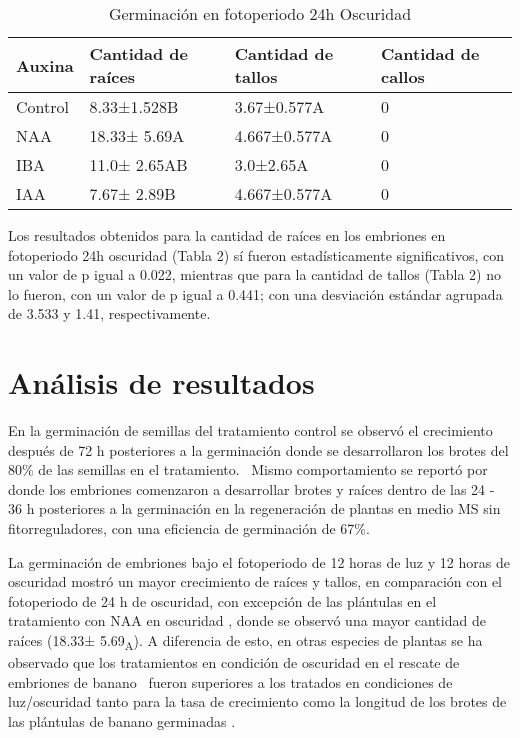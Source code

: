 \documentclass{article}
\begin{document}
\begin{multicols}{2}
\begin{table*}[ht]
\centering
\begin{tabularx}{\textwidth}{ | X | X | X | X | }
\toprule
\rowcolor[HTML]{EFEFEF} 
Auxina  & Cantidad de raíces & Cantidad de tallos & Cantidad de callos \\ \midrule
Control & 8.33±1.528B        & 3.67±0.577A        & 0                  \\ \midrule
NAA     & 18.33± 5.69A       & 4.667±0.577A       & 0                  \\ \midrule
IBA     & 11.0± 2.65AB       & 3.0±2.65A          & 0                  \\ \midrule
IAA     & 7.67± 2.89B        & 4.667±0.577A       & 0                  \\ \bottomrule
\end{tabularx}
\caption{Germinación en fotoperiodo 24h Oscuridad}
\end{table*}


Los resultados obtenidos para la cantidad de raíces en los embriones en fotoperiodo 24h oscuridad (Tabla 2) sí fueron estadísticamente significativos, con un valor de p igual a 0.022, mientras que para la cantidad de tallos (Tabla 2) no lo fueron, con un valor de p igual a 0.441; con una desviación estándar agrupada de 3.533 y 1.41, respectivamente. 

\section{Análisis de resultados}

En la germinación de semillas del tratamiento control se observó el crecimiento después de 72 h posteriores a la germinación donde se desarrollaron los brotes del 80\% de las semillas en el tratamiento.  Mismo comportamiento se reportó por \cite{12} donde los embriones comenzaron a desarrollar brotes y raíces dentro de las 24 - 36 h posteriores a la germinación en la regeneración de plantas en medio MS sin fitorreguladores, con una eficiencia de germinación de 67\%. 

La germinación de embriones bajo el fotoperiodo de 12 horas de luz y 12 horas de oscuridad mostró un mayor crecimiento de raíces y tallos, en comparación con el fotoperiodo de 24 h de oscuridad, con excepción de las plántulas en el tratamiento con NAA en oscuridad , donde se observó una mayor cantidad de raíces (18.33± 5.69\textsubscript{A}). A diferencia de esto, en otras especies de plantas se ha observado que los tratamientos en condición de oscuridad en el rescate de embriones de banano  fueron superiores a los tratados en condiciones de luz/oscuridad tanto para la tasa de crecimiento como la longitud de los brotes de las plántulas de banano germinadas \cite{3}. 


\end{multicols}
\end{document}
